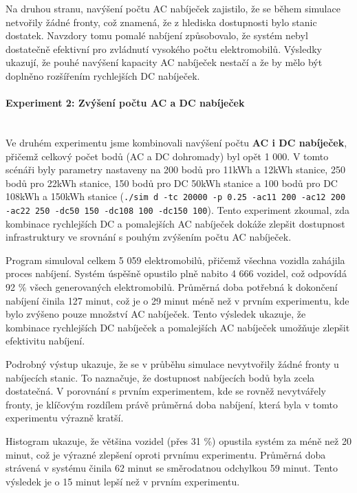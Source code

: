 \documentclass[a4paper,11pt]{article}
\begin{document}
Na druhou stranu, navýšení počtu AC nabíječek zajistilo, že se během simulace netvořily žádné fronty, což znamená, že z hlediska dostupnosti bylo stanic dostatek. Navzdory tomu pomalé nabíjení způsobovalo, že systém nebyl dostatečně efektivní pro zvládnutí vysokého počtu elektromobilů. Výsledky ukazují, že pouhé navýšení kapacity AC nabíječek nestačí a že by mělo být doplněno rozšířením rychlejších DC nabíječek.


\paragraph{Experiment 2: Zvýšení počtu AC a DC nabíječek\\\\}
Ve druhém experimentu jsme kombinovali navýšení počtu \textbf{AC i DC nabíječek}, přičemž celkový počet bodů (AC a DC dohromady) byl opět 1 000. V tomto scénáři byly parametry nastaveny na 200 bodů pro 11kWh a 12kWh stanice, 250 bodů pro 22kWh stanice, 150 bodů pro DC 50kWh stanice a 100 bodů pro DC 108kWh a 150kWh stanice (\texttt{./sim d -tc 20000 -p 0.25 -ac11 200 -ac12 200 -ac22 250 -dc50 150 -dc108 100 -dc150 100}). Tento experiment zkoumal, zda kombinace rychlejších DC a pomalejších AC nabíječek dokáže zlepšit dostupnost infrastruktury ve srovnání s pouhým zvýšením počtu AC nabíječek.

Program simuloval celkem 5 059 elektromobilů, přičemž všechna vozidla zahájila proces nabíjení. Systém úspěšně opustilo plně nabito 4 666 vozidel, což odpovídá 92 \% všech generovaných elektromobilů. Průměrná doba potřebná k dokončení nabíjení činila 127 minut, což je o 29 minut méně než v prvním experimentu, kde bylo zvýšeno pouze množství AC nabíječek. Tento výsledek ukazuje, že kombinace rychlejších DC nabíječek a pomalejších AC nabíječek umožňuje zlepšit efektivitu nabíjení.

Podrobný výstup ukazuje, že se v průběhu simulace nevytvořily žádné fronty u nabíjecích stanic. To naznačuje, že dostupnost nabíjecích bodů byla zcela dostatečná. V porovnání s prvním experimentem, kde se rovněž nevytvářely fronty, je klíčovým rozdílem právě průměrná doba nabíjení, která byla v tomto experimentu výrazně kratší.

Histogram ukazuje, že většina vozidel (přes 31 \%) opustila systém za méně než 20 minut, což je výrazné zlepšení oproti prvnímu experimentu. Průměrná doba strávená v systému činila 62 minut se směrodatnou odchylkou 59 minut. Tento výsledek je o 15 minut lepší než v prvním experimentu.
\end{document}
